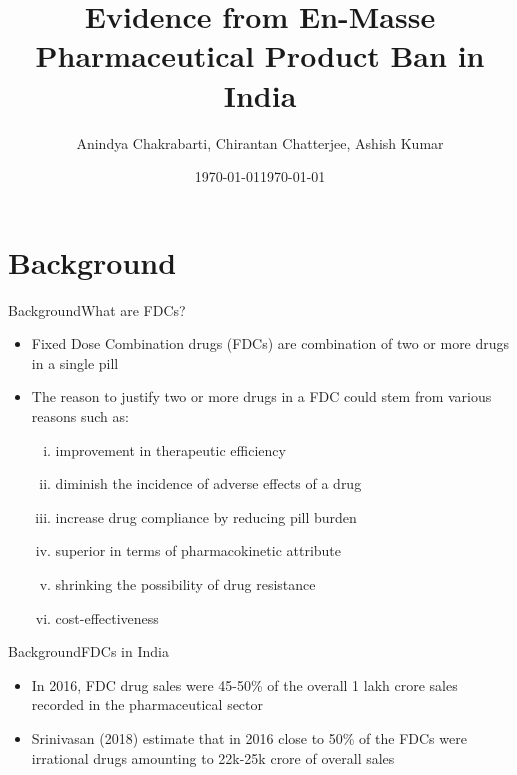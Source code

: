 \documentclass[aspectratio=43]{beamer}
\title{Evidence from En-Masse Pharmaceutical Product Ban in India}
\subtitle{}
\date{\today}
\date{\today}
\author{Anindya Chakrabarti, Chirantan Chatterjee, Ashish Kumar}
\begin{document}
\begin{frame}
\maketitle

\end{frame}

\section{Background}

\begin{frame}{Background}{What are FDCs?}
	\begin{itemize}
		\item Fixed Dose Combination drugs (FDCs) are combination of two or more drugs in a single pill
		\bigskip
		\pause
		\item The reason to justify two or more drugs in a FDC could stem from various reasons such as:
		\begin{enumerate}[(i)]
			\pause
			\item improvement in therapeutic efficiency
			\pause
			\item diminish the incidence of adverse effects
			of a drug
			\pause
			\item increase drug compliance by reducing pill burden
			\pause
			\item superior in terms of pharmacokinetic attribute
			\pause
			\item shrinking the possibility of drug resistance
			\pause
			\item cost-effectiveness
		\end{enumerate}
	\end{itemize}
\end{frame}


\begin{frame}{Background}{FDCs in India}
	\begin{itemize}
		\pause
		\item In 2016, FDC drug sales were 45-50\% of the overall 1 lakh crore sales recorded in the pharmaceutical sector
		\medskip
		\pause
		\item \alert{Srinivasan (2018)} estimate that in 2016 close to 50\% of the FDCs were irrational drugs amounting to 22k-25k crore of overall sales
	\end{itemize}
\end{frame}
\end{document}
